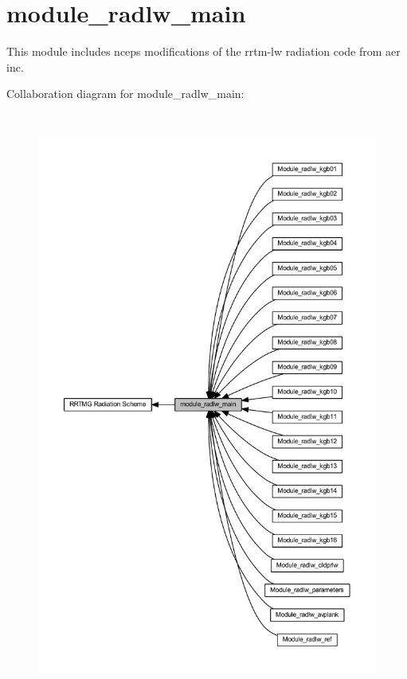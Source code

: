 \hypertarget{group__module__radlw__main}{}\section{module\+\_\+radlw\+\_\+main}
\label{group__module__radlw__main}


This module includes ncep\textquotesingle{}s modifications of the rrtm-\/lw radiation code from aer inc.  


Collaboration diagram for module\+\_\+radlw\+\_\+main\+:\nopagebreak
\begin{figure}[H]
\begin{center}
\leavevmode
\includegraphics[height=550pt]{group__module__radlw__main}
\end{center}
\end{figure}
